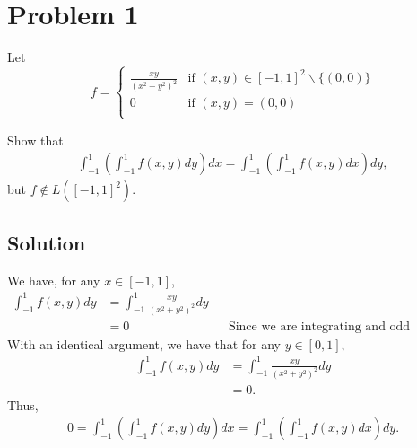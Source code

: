 \documentclass[10pt,a4paper]{article}
\author{Jeremiah Givens}
\theoremstyle{theorem}
\theoremstyle{definition}
\begin{document}
\section*{Problem 1}
Let 
\[   f = \left\{
\begin{array}{ll}
      \frac{xy}{(x^2 + y^2)^2} & \text{if } (x, y) \in [-1, 1]^2 \backslash \{(0, 0)\} \\
      0 & \text{if } (x, y) = (0, 0)\\
\end{array} 
\right. \]

Show that 
\begin{align*}
\int_{-1}^1 \left( \int_{-1}^1 f(x, y) dy \right) dx = \int_{-1}^1 \left( \int_{-1}^1 f(x, y) dx \right) dy,
\end{align*}
but $f \not \in L([-1, 1]^2)$.

\subsection*{Solution}
We have, for any $x \in [-1, 1]$,
\begin{align*}
\int_{-1}^1 f(x, y) dy &= \int_{-1}^1 \frac{xy}{(x^2 + y^2)^2} dy\\
&= 0 &&\text{Since we are integrating and odd function over symmetric bounds}
\end{align*}
With an identical argument, we have that for any $y \in [0, 1]$,
\begin{align*}
\int_{-1}^1 f(x, y) dy &= \int_{-1}^1 \frac{xy}{(x^2 + y^2)^2} dy\\
&= 0.
\end{align*}
Thus,
\begin{align*}
0 = \int_{-1}^1 \left( \int_{-1}^1 f(x, y) dy \right) dx = \int_{-1}^1 \left( \int_{-1}^1 f(x, y) dx \right) dy.
\end{align*}
\end{document}
